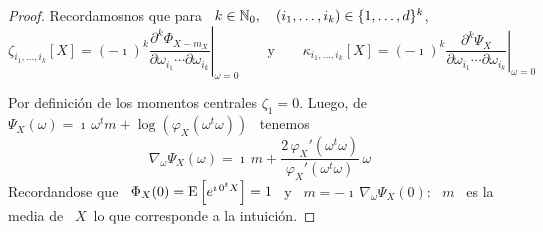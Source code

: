 \begin{proof}
  Recordamosnos que para \ $k \in \mathbb{N}_0, \quad (i_1 , \ldots , i_k) \in \{ 1 ,
  \ldots , d \}^k$,
  \[
  \zeta_{i_1,\ldots,i_k}[X]     =     (-    \imath)^k     \left.\frac{\partial^k
      \Phi_{X-m_X}}{\partial         \omega_{i_1}         \cdots        \partial
      \omega_{i_k}}\right|_{\omega=0}        \qquad        \mbox{y}       \qquad
  \kappa_{i_1,\ldots,i_k}[X]     =    (-     \imath)^k    \left.\frac{\partial^k
      \Psi_X}{\partial           \omega_{i_1}           \cdots          \partial
      \omega_{i_k}}\right|_{\omega=0}
  \]
  
  Por  definici\'on  de  los  momentos  centrales  $\zeta_1  =  0$.   Luego,  de
  $\Psi_X(\omega)  =  \imath \,  \omega^t  m  +  \log\left( \varphi_X(  \omega^t
    \omega) \right)$ \ tenemos
  \[
  \nabla_\omega \Psi_X(\omega) =  \imath \, m + \frac{2  \, \varphi_X'( \omega^t
    \omega)}{\varphi_X'( \omega^t \omega)} \, \omega
  \]
  Recordandose que \ $\Phi_X(0) = \operatorname{E}\left[  e^{\imath \, 0^t X} \right] = 1$ \
  y \ $m =  - \imath \, \nabla_\omega \Psi_X(0)$: \ $m$ \ es  la media de \ $X$\
  lo que corresponde a la intuici\'on.


\end{proof}
